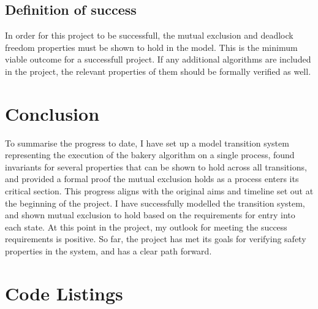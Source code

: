 \documentclass{article}
\theoremstyle{definition}
\begin{document}
    \subsection{Definition of success}
        In order for this project to be successfull, the mutual exclusion and deadlock freedom properties must be shown
        to hold in the model.
        This is the minimum viable outcome for a successfull project. 
        If any additional algorithms are included in the project, the relevant properties of them should be formally verified as well.

\section{Conclusion}
    To summarise the progress to date, I have set up a model transition system representing the 
    execution of the bakery algorithm on a single process, found invariants for several properties that 
    can be shown to hold across all transitions, and provided a formal proof the mutual exclusion holds
    as a process enters its critical section.
    This progress aligns with the original aims and timeline set out at the beginning of the project.
    I have successfully modelled the transition system, and shown mutual exclusion to hold based on the requirements
    for entry into each state.
    At this point in the project, my outlook for meeting the success requirements is positive.
    So far, the project has met its goals for verifying safety properties in the system, 
    and has a clear path forward.




\appendix

\section{Code Listings}
\end{document}
